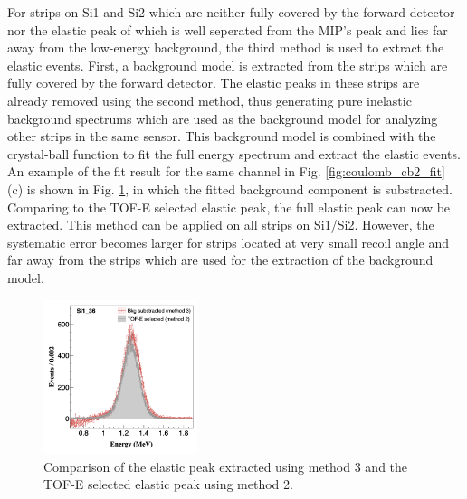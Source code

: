 \documentclass[fleqn,twocolumn,a4paper]{ikpar}
\begin{document}
\par
\medskip

For strips on Si1 and Si2 which are neither fully covered by the forward detector nor
the elastic peak of which is well seperated from the MIP's peak and lies
far away from the low-energy background, the third method is used to
extract the elastic events.
First, a background model is extracted from the strips which are fully covered by the forward detector.
The elastic peaks in these strips are already removed using the second method, thus generating 
pure inelastic background spectrums which are used as the background model
for analyzing other strips in the same sensor.
This background model is combined with the crystal-ball function to fit the full
energy spectrum and extract the elastic events.
An example of the fit result for the same channel in Fig. \ref{fig:coulomb_cb2_fit}
(c) is shown in Fig. \ref{fig:bkg_vs_tofe}, in which the fitted background component is substracted. 
Comparing to the TOF-E selected elastic peak, the full elastic peak can now be extracted.
This method can be applied on all strips on Si1/Si2.
However, the systematic error becomes larger for strips located at very small
recoil angle and far away from the strips which are used for the extraction of the background model.
\begin{figure}[!htb]
	\includegraphics[width=0.4\textwidth]{./bkg_vs_tofe.png}
  \caption{Comparison of the elastic peak extracted using method 3 and the TOF-E
    selected elastic peak using method 2.}
  \label{fig:bkg_vs_tofe}
\end{figure}

\par
\medskip
\end{document}
